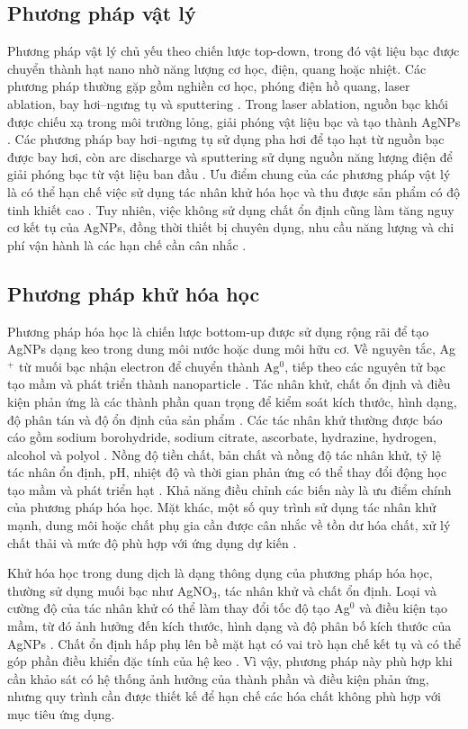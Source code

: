 \subsection{Phương pháp vật lý}
Phương pháp vật lý chủ yếu theo chiến lược top-down, trong đó vật liệu bạc được chuyển thành hạt nano nhờ năng lượng cơ học, điện, quang hoặc nhiệt.
Các phương pháp thường gặp gồm nghiền cơ học, phóng điện hồ quang, laser ablation, bay hơi--ngưng tụ và sputtering \parencite{iravani2014,nguyen2023}.
Trong laser ablation, nguồn bạc khối được chiếu xạ trong môi trường lỏng, giải phóng vật liệu bạc và tạo thành AgNPs \parencite{lee2019}.
Các phương pháp bay hơi--ngưng tụ sử dụng pha hơi để tạo hạt từ nguồn bạc được bay hơi, còn arc discharge và sputtering sử dụng nguồn năng lượng điện để giải phóng bạc từ vật liệu ban đầu \parencite{iravani2014,nguyen2023}.
Ưu điểm chung của các phương pháp vật lý là có thể hạn chế việc sử dụng tác nhân khử hóa học và thu được sản phẩm có độ tinh khiết cao \parencite{nguyen2023,lee2019}.
Tuy nhiên, việc không sử dụng chất ổn định cũng làm tăng nguy cơ kết tụ của AgNPs, đồng thời thiết bị chuyên dụng, nhu cầu năng lượng và chi phí vận hành là các hạn chế cần cân nhắc \parencite{lee2019}.
\par
\subsection{Phương pháp khử hóa học}
Phương pháp hóa học là chiến lược bottom-up được sử dụng rộng rãi để tạo AgNPs dạng keo trong dung môi nước hoặc dung môi hữu cơ.
Về nguyên tắc, Ag$^+$ từ muối bạc nhận electron để chuyển thành Ag$^0$, tiếp theo các nguyên tử bạc tạo mầm và phát triển thành nanoparticle \parencite{lee2019,nguyen2023}.
Tác nhân khử, chất ổn định và điều kiện phản ứng là các thành phần quan trọng để kiểm soát kích thước, hình dạng, độ phân tán và độ ổn định của sản phẩm \parencite{lee2019,restrepo2021}.
Các tác nhân khử thường được báo cáo gồm sodium borohydride, sodium citrate, ascorbate, hydrazine, hydrogen, alcohol và polyol \parencite{iravani2014,lee2019,nguyen2023}.
Nồng độ tiền chất, bản chất và nồng độ tác nhân khử, tỷ lệ tác nhân ổn định, pH, nhiệt độ và thời gian phản ứng có thể thay đổi động học tạo mầm và phát triển hạt \parencite{lee2019,nguyen2023}.
Khả năng điều chỉnh các biến này là ưu điểm chính của phương pháp hóa học.
Mặt khác, một số quy trình sử dụng tác nhân khử mạnh, dung môi hoặc chất phụ gia cần được cân nhắc về tồn dư hóa chất, xử lý chất thải và mức độ phù hợp với ứng dụng dự kiến \parencite{nguyen2023}.
\par
Khử hóa học trong dung dịch là dạng thông dụng của phương pháp hóa học, thường sử dụng muối bạc như AgNO$_3$, tác nhân khử và chất ổn định.
Loại và cường độ của tác nhân khử có thể làm thay đổi tốc độ tạo Ag$^0$ và điều kiện tạo mầm, từ đó ảnh hưởng đến kích thước, hình dạng và độ phân bố kích thước của AgNPs \parencite{lee2019}.
Chất ổn định hấp phụ lên bề mặt hạt có vai trò hạn chế kết tụ và có thể góp phần điều khiển đặc tính của hệ keo \parencite{lee2019,restrepo2021}.
Vì vậy, phương pháp này phù hợp khi cần khảo sát có hệ thống ảnh hưởng của thành phần và điều kiện phản ứng, nhưng quy trình cần được thiết kế để hạn chế các hóa chất không phù hợp với mục tiêu ứng dụng.
\par
